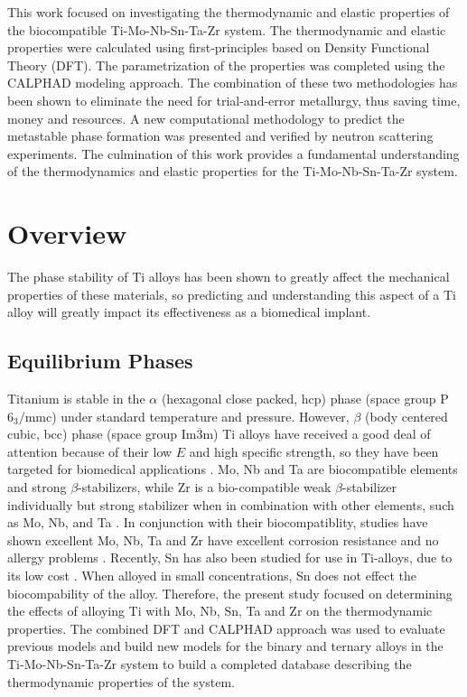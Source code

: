 This work focused on investigating the thermodynamic and elastic properties of the biocompatible Ti-Mo-Nb-Sn-Ta-Zr system. The thermodynamic and elastic properties were calculated using first-principles based on Density Functional Theory (DFT). The parametrization of the properties was completed using the CALPHAD modeling approach. The combination of these two methodologies has been shown to eliminate the need for trial-and-error metallurgy, thus saving time, money and resources. A new computational methodology to predict the metastable phase formation was presented and verified by neutron scattering experiments. The culmination of this work provides a fundamental understanding of the thermodynamics and elastic properties for the Ti-Mo-Nb-Sn-Ta-Zr system. 


\section{Overview}

The phase stability of Ti alloys has been shown to greatly affect the mechanical properties of these materials, so predicting and understanding this aspect of a Ti alloy will greatly impact its effectiveness as a biomedical implant.


\subsection{Equilibrium Phases}

Titanium is stable in the $\alpha$ (hexagonal close packed, hcp) phase (space group P$6_{3}/$mmc) under standard temperature and pressure. However, $\beta$ (body centered cubic, bcc) phase (space group Im$\overline{3}$m) Ti alloys have received a good deal of attention because of their low $E$ and high specific strength, so they have been targeted for biomedical applications \cite{Mei2011,Brailovski2011b}. Mo, Nb and Ta are biocompatible elements and strong $\beta$-stabilizers, while Zr is a bio-compatible weak $\beta$-stabilizer individually but strong stabilizer when in combination with other elements, such as Mo, Nb, and Ta \cite{Long1998a}. In conjunction with their biocompatiblity, studies have shown excellent Mo, Nb, Ta and Zr have excellent corrosion resistance and no allergy problems \cite{Tane2008a}. Recently, Sn has also been studied for use in Ti-alloys, due to its low cost \cite{Niinomi2012}. When alloyed in small concentrations, Sn does not effect the biocompability of the alloy. Therefore, the present study focused on determining the effects of alloying Ti with Mo, Nb, Sn, Ta and Zr on the thermodynamic properties. The combined DFT and CALPHAD approach was used to evaluate previous models and build new models for the binary and ternary alloys in the Ti-Mo-Nb-Sn-Ta-Zr system to build a completed database describing the thermodynamic properties of the system.

